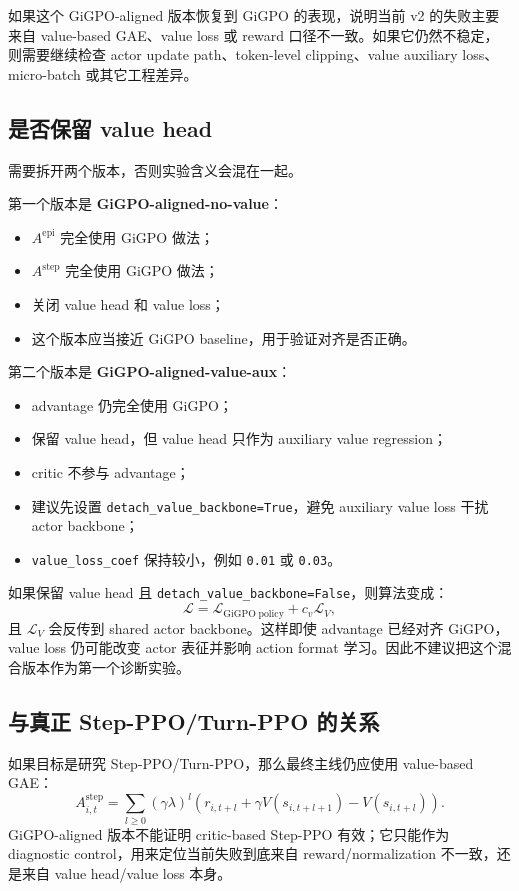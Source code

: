 \documentclass[10pt]{ctexart}
\newcommand{\code}[1]{\texttt{#1}}
\begin{document}
如果这个 GiGPO-aligned 版本恢复到 GiGPO 的表现，说明当前 v2 的失败主要来自 value-based GAE、value loss 或 reward 口径不一致。如果它仍然不稳定，则需要继续检查 actor update path、token-level clipping、value auxiliary loss、micro-batch 或其它工程差异。

\subsection*{是否保留 value head}
需要拆开两个版本，否则实验含义会混在一起。

第一个版本是 \textbf{GiGPO-aligned-no-value}：
\begin{itemize}
  \item \(A^{\mathrm{epi}}\) 完全使用 GiGPO 做法；
  \item \(A^{\mathrm{step}}\) 完全使用 GiGPO 做法；
  \item 关闭 value head 和 value loss；
  \item 这个版本应当接近 GiGPO baseline，用于验证对齐是否正确。
\end{itemize}

第二个版本是 \textbf{GiGPO-aligned-value-aux}：
\begin{itemize}
  \item advantage 仍完全使用 GiGPO；
  \item 保留 value head，但 value head 只作为 auxiliary value regression；
  \item critic 不参与 advantage；
  \item 建议先设置 \code{detach\_value\_backbone=True}，避免 auxiliary value loss 干扰 actor backbone；
  \item \code{value\_loss\_coef} 保持较小，例如 \code{0.01} 或 \code{0.03}。
\end{itemize}

如果保留 value head 且 \code{detach\_value\_backbone=False}，则算法变成：
\[
\mathcal{L}
=
\mathcal{L}_{\mathrm{GiGPO\;policy}}
+c_v\mathcal{L}_{V},
\]
且 \(\mathcal{L}_{V}\) 会反传到 shared actor backbone。这样即使 advantage 已经对齐 GiGPO，value loss 仍可能改变 actor 表征并影响 action format 学习。因此不建议把这个混合版本作为第一个诊断实验。

\subsection*{与真正 Step-PPO/Turn-PPO 的关系}
如果目标是研究 Step-PPO/Turn-PPO，那么最终主线仍应使用 value-based GAE：
\[
A_{i,t}^{\mathrm{step}}
=
\sum_{l\ge 0}(\gamma\lambda)^l
\left(
 r_{i,t+l}
 +\gamma V(s_{i,t+l+1})
 -V(s_{i,t+l})
\right).
\]
GiGPO-aligned 版本不能证明 critic-based Step-PPO 有效；它只能作为 diagnostic control，用来定位当前失败到底来自 reward/normalization 不一致，还是来自 value head/value loss 本身。
\end{document}
